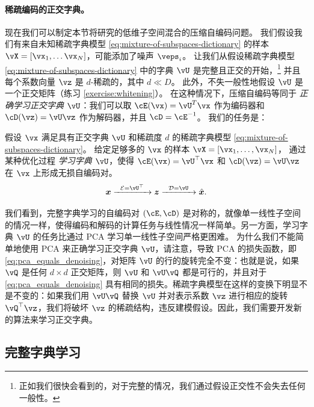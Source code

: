 \documentclass[../../book-main_zh.tex]{subfiles}
\begin{document}
\paragraph{稀疏编码的正交字典。}
现在我们可以制定本节将研究的低维子空间混合的压缩自编码问题。
我们假设我们有来自未知稀疏字典模型 \eqref{eq:mixture-of-subspaces-dictionary} 的样本 $\vX = [\vx_1, \dots \vx_N]$，可能添加了噪声 $\veps_i$。
让我们从假设稀疏字典模型 \eqref{eq:mixture-of-subspaces-dictionary} 中的字典 $\vU$ 是完整且正交的开始，\footnote{正如我们很快会看到的，对于完整的情况，我们通过假设正交性不会失去任何一般性。} 并且每个系数向量 $\vz$ 是 $d$-稀疏的，其中 $d \ll D$。
此外，不失一般性地假设 $\vU$ 是一个正交矩阵（练习 \ref{exercise:whitening}）。
在这种情况下，压缩自编码等同于 \textit{正确学习正交字典 $\vU$}：我们可以取 $\cE(\vx) = \vU^T \vx$ 作为编码器和 $\cD(\vz) = \vU \vz$ 作为解码器，并且 $\cD = \cE^{-1}$。
我们的任务是：
\begin{tcolorbox}
    假设 $\vx$ 满足具有正交字典 $\vU$ 和稀疏度 $d$ 的稀疏字典模型 \eqref{eq:mixture-of-subspaces-dictionary}。
    给定足够多的 $\vx$ 的样本 $\vX = [\vx_1, \dots, \vx_N]$，
    通过某种优化过程 \textit{学习字典 $\vU$}，使得
    $\cE(\vx) = \vU^\top \vx$ 和 $\cD(\vz) = \vU \vz$ 在 $\vx$ 上形成无损自编码对。
\begin{equation}
\x \xrightarrow{\hspace{2mm} \mathcal{E} = \vU^\top \hspace{2mm}}  \z \xrightarrow{\hspace{2mm} \mathcal{D} = \vU \hspace{2mm}}   \hat{\x}.  
\label{eqn:autoencoding-DL}
\end{equation}    
\end{tcolorbox}
我们看到，完整字典学习的自编码对 $(\cE, \cD)$ 是对称的，就像单一线性子空间的情况一样，使得编码和解码的计算任务与线性情况一样简单。另一方面，学习字典 $\vU$ 的任务比通过 PCA 学习单一线性子空间严格更困难。
为什么我们不能简单地使用 PCA 来正确学习正交字典 $\vU$，请注意，导致 PCA 的损失函数，即 \eqref{eq:pca_equals_denoising}，对矩阵 $\vU$ 的行的旋转完全不变：也就是说，如果 $\vQ$ 是任何 $d \times d$ 正交矩阵，则 $\vU$ 和 $\vU \vQ$ 都是可行的，并且对于 \eqref{eq:pca_equals_denoising} 具有相同的损失。稀疏字典模型在这样的变换下明显不是不变的：如果我们用 $\vU \vQ$ 替换 $\vU$ 并对表示系数 $\vz$ 进行相应的旋转 $\vQ^\top \vz$，我们将破坏 $\vz$ 的稀疏结构，违反建模假设。因此，我们需要开发新的算法来学习正交字典。

\subsection{完整字典学习}
\label{sec:complete-dictionary}
\end{document}
